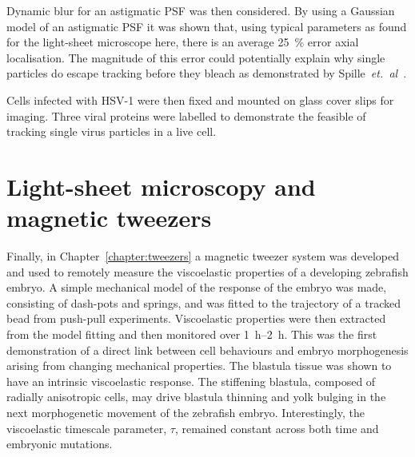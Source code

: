 Dynamic blur for an astigmatic \gls{PSF} was then considered.
By using a Gaussian model of an astigmatic \gls{PSF} it was shown that, using typical parameters as found for the light-sheet microscope here, there is an average \SI{25}{\percent} error axial localisation.
The magnitude of this error could potentially explain why single particles do escape tracking before they bleach as demonstrated by Spille~\emph{et.~al}~\cite{spilleDirectObservationMobility2015}.

Cells infected with \gls{HSV}-1 were then fixed and mounted on glass cover slips for imaging.
Three viral proteins were labelled to demonstrate the feasible of tracking single virus particles in a live cell.

\section{Light-sheet microscopy and magnetic tweezers}
Finally, in Chapter~\ref{chapter:tweezers} a magnetic tweezer system was developed and used to remotely measure the viscoelastic properties of a developing zebrafish embryo.
A simple mechanical model of the response of the embryo was made, consisting of dash-pots and springs, and was fitted to the trajectory of a tracked bead from push-pull experiments.
Viscoelastic properties were then extracted from the model fitting and then monitored over \SIrange{1}{2}{\hour}.
This was the first demonstration of a direct link between cell behaviours and embryo morphogenesis arising from changing mechanical properties.
The blastula tissue was shown to have an intrinsic viscoelastic response.
The stiffening blastula, composed of radially anisotropic cells, may drive blastula thinning and yolk bulging in the next morphogenetic movement of the zebrafish embryo.
Interestingly, the viscoelastic timescale parameter, \(\tau\), remained constant across both time and embryonic mutations.
